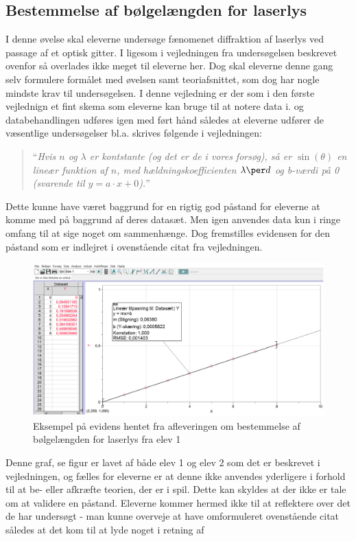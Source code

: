 \subsection*{Bestemmelse af bølgelængden for laserlys}
I denne øvelse skal eleverne undersøge fænomenet diffraktion af laserlys ved passage af et optisk gitter. I ligesom i vejledningen fra undersøgelsen beskrevet ovenfor så overlades ikke meget til eleverne her. Dog skal eleverne denne gang selv formulere formålet med øvelsen  samt teoriafsnittet, som dog har nogle mindste krav til undersøgelsen. I denne vejledning er der som i den første vejlednign et fint skema som eleverne kan bruge til at notere data i. og databehandlingen udføres igen med ført hånd således at eleverne udfører de væsentlige undersøgelser bl.a. skrives følgende i vejledningen:
\begin{quote}
	``\emph{Hvis $n$ og $\lambda$ er kontstante (og det er de i vores forsøg), så er $\sin(\theta)$ en lineær funktion af $n$, med hældningskoefficienten $\lambda\per d$ og b-værdi på 0 (svarende til $y = a\cdot x + 0$).}''
\end{quote}
Dette kunne have været baggrund for en rigtig god påstand for eleverne at komme med på baggrund af deres datasæt. Men igen anvendes data kun i ringe omfang til at sige noget om sammenhænge. Dog fremstilles evidensen for den påstand som er indlejret i ovenstående citat fra vejledningen. 
\begin{figure}[h!]
	\centering
	\includegraphics[width=\textwidth]{Figs/EviHan}
	\caption[Elev produktion 1]{Eksempel på evidens hentet fra afleveringen om bestemmelse af bølgelængden for laserlys fra elev 1}
	\label{fig:elev1}
\end{figure}
Denne graf, se figur  er lavet af både elev 1 og elev 2 som det er beskrevet i vejledningen, og fælles for eleverne er at denne ikke anvendes yderligere i forhold til at be- eller afkræfte teorien, der er i spil. Dette kan skyldes at der ikke er tale om at validere en påstand. Eleverne kommer hermed ikke til at reflektere over det de har undersøgt - man kunne overveje at have omformuleret ovenstående citat således at det kom til at lyde noget i retning af 
